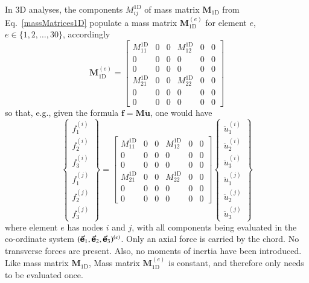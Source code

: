 In 3D analyses, the components $M^{\mathrm{1D}}_{ij}$ of mass matrix $\mathbf{M}_{\mathrm{1D}}$ from 
Eq.~\ref{massMatrices1D} populate a mass matrix $\boldsymbol{M}_{\mathrm{1D}}^{(e)}$ for element $e$, $e \in \{ 1,2,\ldots,30 \}$, accordingly
\begin{equation}
    \boldsymbol{M}_{\mathrm{1D}}^{(e)} = 
    \left[ \begin{array}{ccc|ccc}
    M_{11}^{\mathrm{1D}} & 0 & 0 & M_{12}^{\mathrm{1D}} & 0 & 0 \\
    0 & 0 & 0 & 0 & 0 & 0 \\
    0 & 0 & 0 & 0 & 0 & 0 \\ \hline
    M_{21}^{\mathrm{1D}} & 0 & 0 & M_{22}^{\mathrm{1D}} & 0 & 0 \\
    0 & 0 & 0 & 0 & 0 & 0 \\
    0 & 0 & 0 & 0 & 0 & 0
    \end{array} \right]
    \label{elementMassMatrix1D}
\end{equation}
so that, e.g., given the formula $\boldsymbol{f} = \mathbf{M} \ddot{\boldsymbol{u}}$, one would have
\begin{displaymath}
    \left\{ \begin{matrix}
    f^{(i)}_1 \\ f^{(i)}_2 \\ f^{(i)}_3 \\ \hline
    f^{(j)}_1 \\ f^{(j)}_2 \\ f^{(j)}_3
    \end{matrix} \right\} = 
    \left[ \begin{array}{ccc|ccc}
    M_{11}^{\mathrm{1D}} & 0 & 0 & M_{12}^{\mathrm{1D}} & 0 & 0 \\
    0 & 0 & 0 & 0 & 0 & 0 \\
    0 & 0 & 0 & 0 & 0 & 0 \\ \hline
    M_{21}^{\mathrm{1D}} & 0 & 0 & M_{22}^{\mathrm{1D}} & 0 & 0 \\
    0 & 0 & 0 & 0 & 0 & 0 \\
    0 & 0 & 0 & 0 & 0 & 0
    \end{array} \right] \left\{ \begin{matrix} 
    \ddot{u}^{(i)}_1 \\ \ddot{u}^{(i)}_2 \\ \ddot{u}^{(i)}_3 \\ \hline
    \ddot{u}^{(j)}_1 \\ \ddot{u}^{(j)}_2 \\ \ddot{u}^{(j)}_3
    \end{matrix} \right\} 
\end{displaymath}
where element $e$ has nodes $i$ and $j$, with all components being evaluated in the co-ordinate system $( \vec{\boldsymbol{\mathsf{e}}}_1 , \vec{\boldsymbol{\mathsf{e}}}_2 , \vec{\boldsymbol{\mathsf{e}}}_3 )^{(e)}$.  Only an axial force is carried by the chord.  No transverse forces are present.  Also, no moments of inertia have been introduced.  Like mass matrix $\mathbf{M}_{\mathrm{1D}}$, Mass matrix $\boldsymbol{M}_{\mathrm{1D}}^{(e)}$ is constant, and therefore only needs to be evaluated once.


